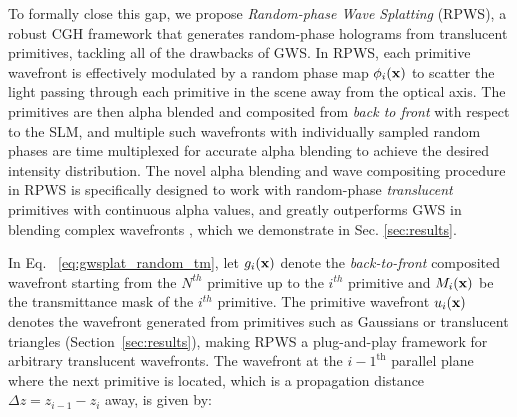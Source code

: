  To formally close this gap, we propose \textit{Random-phase Wave Splatting} (RPWS), a robust CGH framework that generates random-phase holograms from translucent primitives, tackling all of the drawbacks of GWS. In RPWS, each primitive wavefront is effectively modulated by a random phase map $\phi_i(\mathbf{x})$ to scatter the light passing through each primitive in the scene away from the optical axis. The primitives are then alpha blended and composited from \textit{back to front} with respect to the SLM, and multiple such wavefronts with individually sampled random phases are time multiplexed for accurate alpha blending to achieve the desired intensity distribution. The novel alpha blending and wave compositing procedure in RPWS is specifically designed to work with random-phase \textit{translucent} primitives with continuous alpha values, and greatly outperforms GWS in blending complex wavefronts \cite{choi2025gaussian}, which we demonstrate in Sec. \ref{sec:results}.


In Eq. ~\ref{eq:gwsplat_random_tm}, let $g_i(\mathbf{x})$ denote the \textit{back-to-front} composited wavefront starting from the $N^{th}$ primitive up to the $i^{th}$ primitive and $M_i(\mathbf{x})$ be the transmittance mask of the $i^{th}$ primitive. The primitive wavefront \( u_i(\mathbf{x}) \) denotes the wavefront generated from primitives such as Gaussians or translucent triangles (Section~\ref{sec:results}), making RPWS a plug-and-play framework for arbitrary translucent wavefronts. The wavefront at the ${i - 1}^{\text{th}}$ parallel plane where the next primitive is located, which is a propagation distance $\Delta z = z_{i - 1} -  z_{i}$ away, is given by:

